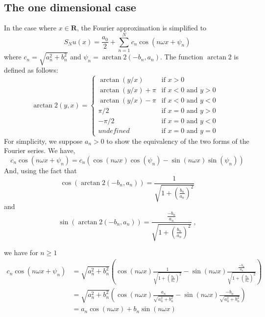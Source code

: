\documentclass[11pt]{article}
\begin{document}
\subsection{The one dimensional case}
In the case where $x \in \mathbf R$, the Fourier approximation is simplified to
\begin{equation}\label{fourier_shift_1d}
    S_N u(x) = \frac{a_0}{2} + \sum_{n=1}^N c_{n} \cos(n \omega x + \psi_{n})
\end{equation}
where $c_{n} = \sqrt{a_{n}^2 + b_{n}^2}$ and $\psi_n = \arctan2(-b_{n},a_{n})$. The function $\arctan2$ is defined as follows:
\begin{equation}
  \arctan2(y, x) = 
    \begin{cases}
      \arctan(y/x) & \text{if $x>0$}\\
      \arctan(y/x)+\pi & \text{if $x<0$ and $y>0$ }\\
      \arctan(y/x)-\pi & \text{if $x<0$ and $y<0$ }\\
      \pi/2 & \text{if $x=0$ and $y>0$ }\\
      -\pi/2 & \text{if $x=0$ and $y<0$ }\\
      undefined & \text{if $x=0$ and $y=0$ }
    \end{cases}       
\end{equation}
For simplicity, we suppose $a_n >0$ to show the equivalency of the two forms of the Fourier series. We have, $$c_{n} \cos(n \omega x + \psi_{n}) = c_{n}\left(\cos(n \omega x) \cos(\psi_{n}) - \sin(n \omega x) \sin(\psi_{n})\right)$$
And, using the fact that $$\cos(\arctan2(-b_{n},a_{n})) = \frac{1}{\sqrt{1+(\frac{b_n}{a_n})^2}}$$
and
$$\sin(\arctan2(-b_{n},a_{n})) = \frac{\frac{-b_n}{a_n}}{\sqrt{1+(\frac{b_n}{a_n})^2}}\; ,$$

we have for $n \geq 1$ 
\begin{align*}
    c_{n} \cos(n \omega x + \psi_{n}) &= \sqrt{a_{n}^2 + b_{n}^2}\left(\cos(n \omega x) \frac{1}{\sqrt{1+(\frac{b_n}{a_n})^2}} - \sin(n \omega x) \frac{\frac{-b_n}{a_n}}{\sqrt{1+(\frac{b_n}{a_n})^2}}\right)\\
   &= \sqrt{a_{n}^2 + b_{n}^2}\left(\cos(n \omega x) \frac{a_n}{\sqrt{a_n^2+b_n^2}} - \sin(n \omega x) \frac{- b_n}{\sqrt{a_n^2+b_n^2}}\right) \\
   &= a_n\cos(n \omega x) +b_n \sin(n \omega x) \\
\end{align*}
\end{document}
